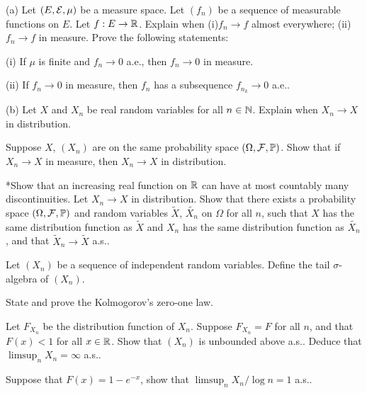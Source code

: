 \begin{question}{10}
    (a) Let $(E,\mathcal{E},\mu)$ be a measure space. Let $(f_n)$ be a sequence of measurable functions on $E$. Let $f:E \rightarrow \mathbb{R}$. Explain when (i)$f_n\rightarrow f$ almost everywhere; (ii)$f_n\rightarrow f$ in measure. Prove the following statements:

    (i) If $\mu$ is finite and $f_n \rightarrow 0$ a.e., then $f_n \rightarrow 0$ in measure.

    (ii) If $f_n \rightarrow 0$ in measure, then $f_n$ has a subsequence $f_{n_k} \rightarrow 0$ a.e.. \bigskip
    
    (b) Let $X$ and $X_n$ be real random variables for all $n\in \mathbb{N}$. Explain when $X_n \rightarrow X$ in distribution.

    Suppose $X$, $(X_n)$ are on the same probability space $(\Omega,\mathcal{F},\mathbb{P})$. Show that if $X_n \rightarrow X$ in measure, then $X_n \rightarrow X$ in distribution.

    *Show that an increasing real function on $\mathbb{R}$ can have at most countably many discontinuities. Let $X_n \rightarrow X$ in distribution. Show that there exists a probability space $(\Omega,\mathcal{F},\mathbb{P})$ and random variables $\tilde{X}$, $\tilde{X_n}$ on $\Omega$ for all $n$, such that $X$ has the same distribution function as $\tilde{X}$ and $X_n$ has the same distribution function as $\tilde{X_n}$, and that $\tilde X_n \rightarrow \tilde X$ a.s..
\end{question}

\begin{question}{11}
    Let $(X_n)$ be a sequence of independent random variables. Define the tail $\sigma$-algebra of $(X_n)$. 

    State and prove the Kolmogorov's zero-one law.

    Let $F_{X_n}$ be the distribution function of $X_n$. Suppose $F_{X_n} = F$ for all $n$, and that $F(x) < 1$ for all $x\in \mathbb{R}$. Show that $(X_n)$ is unbounded above a.s.. Deduce that $\limsup_n X_n = \infty$ a.s..

    Suppose that $F(x) = 1 - e^{-x}$, show that $\limsup_n X_n/\log n =1$ a.s..
\end{question}

